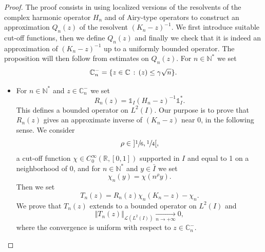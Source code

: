 \documentclass[JEP,XML,SOM,Unicode]{cedram}
\let\mathcal\mathscr
\theoremstyle{plain}
\theoremstyle{definition}
\newcommand {\limt}[2]{\xrightarrow[#1 \to #2]{}}
\newcommand{\nr}[1]{\Vert #1\Vert}
\newcommand{\set}[1]{\{ #1\}}
\newcommand{\inv}{^{-1}}
\newcommand{\1}{\mathds 1}
\newcommand{\st}{\,:\,}
\let\Re\relax
\DeclareMathOperator{\Re}{\mathsf{Re}\mkern2mu}
\newcommand{\R}{\mathbb{R}}
\def\C{\mathbb{C}}
\newcommand{\N}{\mathbb{N}}
\let\g\gamma
\let\h\chi
\newcommand{\Lc}{{\mathcal L}}
\begin{document}
\begin{proof}
The proof consists in using localized versions of the resolvents of the complex harmonic operator $H_n$ and of Airy-type operators to construct an approximation $Q_n(z)$ of the resolvent $(K_n-z)\inv$. We first introduce suitable cut-off functions, then we define $Q_n(z)$ and finally we check that it is indeed an approximation
of $(K_n -z)^{-1}$ up to a uniformly bounded operator. The proposition will then follow from estimates on $Q_n(z)$.
For $n \in \N^*$ we set
\[
\C_n^- = \set{z \in \C \st \Re(z) \leq \g \sqrt n}.
\]

\begin{itemize}
\item
For $n \in \N^*$ and $z \in \C_n^-$ we set
\[
R_n(z) = \1_I (H_n-z)\inv \1_I^*.
\]
This defines a bounded operator on $L^2(I)$. Our purpose is to prove that $R_n(z)$ gives an approximate inverse of $(K_n-z)$ near 0, in the following sense. We consider
\[
\rho \in{}]\sfrac 16,\sfrac 14[,
\]
a cut-off function $\h \in C_0^\infty(\R,[0,1])$ supported in $I$ and equal to 1 on a neighborhood of 0, and for $n \in \N^*$ and $y \in \bar I$ we set
\[
\h_n(y) = \h(n^\rho y).
\]
Then we set
\[
T_n(z) = R_n(z) \chi_n (K_n-z) - \chi_n.
\]
We prove that $T_n(z)$ extends to a bounded operator on $L^2(I)$ and
\begin{equation} \label{estim-res-Rn}
\nr{T_n(z)}_{\Lc(L^2(I))} \limt n {+\infty} 0,
\end{equation}
where the convergence is uniform with respect to $z \in \C_n^-$.


\end{itemize}
\end{proof}
\end{document}
